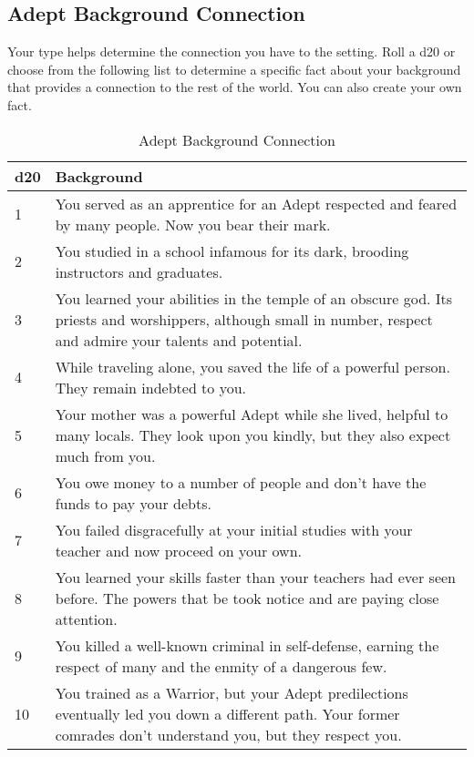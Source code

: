 \subsection{Adept Background Connection}

Your type helps determine the connection you have to the setting. Roll a d20 or choose from the following list to determine a specific fact about your background that provides a connection to the rest of the world. You can also create your own fact.

\begin{table*}
\centering

\caption{Adept Background Connection}
\label{tab:Adept Background Connection}

\begin{tabularx}{\textwidth}{| p{} | p{} |}
\hline
\textbf{d20} & \textbf{Background} \\
\hline
1 & You served as an apprentice for an Adept respected and feared by many people. Now you bear their mark. \\ \hline
2 & You studied in a school infamous for its dark, brooding instructors and graduates. \\ \hline
3 & You learned your abilities in the temple of an obscure god. Its priests and worshippers, although small in number, respect and admire your talents and potential.  \\ \hline
4 & While traveling alone, you saved the life of a powerful person. They remain indebted to you.  \\ \hline
5 & Your mother was a powerful Adept while she lived, helpful to many locals. They look upon you kindly, but they also expect much from you.  \\ \hline
6 & You owe money to a number of people and don’t have the funds to pay your debts. \\ \hline
7 & You failed disgracefully at your initial studies with your teacher and now proceed on your own. \\ \hline
8 & You learned your skills faster than your teachers had ever seen before. The powers that be took notice and are paying close attention.  \\ \hline
9 & You killed a well-known criminal in self-defense, earning the respect of many and the enmity of a dangerous few.  \\ \hline
10 & You trained as a Warrior, but your Adept predilections eventually led you down a different path. Your former comrades don’t understand you, but they respect you.  \\ \hline

\end{tabularx}
\end{table*}
